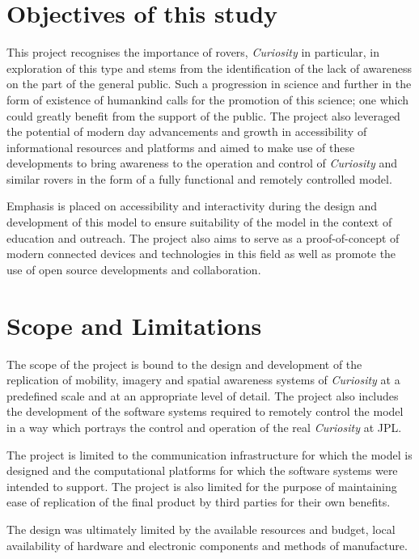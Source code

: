 \section{Objectives of this study}
  This project recognises the importance of rovers, \textit{Curiosity} in particular, in exploration of this type and stems from the identification of the lack of awareness on the part of the general public. Such a progression in science and further in the form of existence of humankind calls for the promotion of this science; one which could greatly benefit from the support of the public. The project also leveraged the potential of modern day advancements and growth in accessibility of informational resources and platforms and aimed to make use of these developments to bring awareness to the operation and control of \textit{Curiosity} and similar rovers in the form of a fully functional and remotely controlled model.
  
  Emphasis is placed on accessibility and interactivity during the design and development of this model to ensure suitability of the model in the context of education and outreach. The project also aims to serve as a proof-of-concept of modern connected devices and technologies in this field as well as promote the use of open source developments and collaboration.

\section{Scope and Limitations}
  The scope of the project is bound to the design and development of the replication of mobility, imagery and spatial awareness systems of \textit{Curiosity} at a predefined scale and at an appropriate level of detail. The project also includes the development of the software systems required to remotely control the model in a way which portrays the control and operation of the real \textit{Curiosity} at JPL.
  
  The project is limited to the communication infrastructure for which the model is designed and the computational platforms for which the software systems were intended to support. The project is also limited for the purpose of maintaining ease of replication of the final product by third parties for their own benefits.
  
  The design was ultimately limited by the available resources and budget, local availability of hardware and electronic components and methods of manufacture.
  
